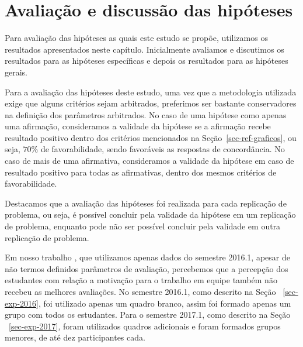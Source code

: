 \section{Avaliação e discussão das hipóteses}
\label{sec-avaliacao-hipoteses}
Para avaliação das hipóteses as quais este estudo se propõe, utilizamos
os resultados apresentados neste capítulo.
Inicialmente avaliamos e discutimos os resultados para as hipóteses
específicas e depois os resultados para as hipóteses gerais.

Para a avaliação das hipóteses deste estudo, uma vez que a
metodologia utilizada exige que alguns critérios sejam
arbitrados, preferimos ser bastante conservadores
na definição dos parâmetros arbitrados.
No caso de uma hipótese como apenas uma afirmação, consideramos
a validade da hipótese se a afirmação recebe
resultado positivo dentro dos critérios mencionados na
Seção~\ref{sec-ref-graficos}, ou seja, $70\%$ de favorabilidade,
sendo favoráveis as respostas de concordância.
No caso de mais de uma afirmativa, consideramos a validade
da hipótese em caso de resultado positivo para todas
as afirmativas, dentro dos mesmos critérios de favorabilidade.

Destacamos que a avaliação das hipóteses foi realizada para
cada replicação de problema, ou seja, é possível concluir pela
validade da hipótese em um replicação de problema, enquanto pode
não ser possível concluir pela validade em outra replicação
de problema.


\AprovacaoHipoteseResultado{}{}{}{}{}{}{}{}{}


Em nosso trabalho \cite{gavaza2017}, que utilizamos apenas dados do
semestre 2016.1, apesar de não termos definidos parâmetros
de avaliação, percebemos que a percepção dos estudantes com relação
a motivação para o trabalho em equipe também não recebeu as melhores
avaliações.
No semestre 2016.1, como descrito na Seção ~\ref{sec-exp-2016}, foi utilizado
apenas um quadro branco, assim foi formado apenas um grupo com todos
os estudantes.
Para o semestre 2017.1, como descrito na Seção ~\ref{sec-exp-2017}, foram
utilizados quadros adicionais e foram formados grupos menores,
de até dez participantes cada.

